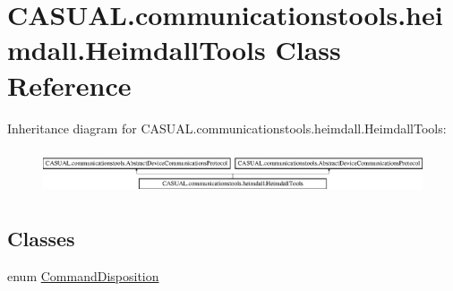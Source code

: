 \hypertarget{class_c_a_s_u_a_l_1_1communicationstools_1_1heimdall_1_1_heimdall_tools}{\section{C\-A\-S\-U\-A\-L.\-communicationstools.\-heimdall.\-Heimdall\-Tools Class Reference}
\label{class_c_a_s_u_a_l_1_1communicationstools_1_1heimdall_1_1_heimdall_tools}
}
Inheritance diagram for C\-A\-S\-U\-A\-L.\-communicationstools.\-heimdall.\-Heimdall\-Tools\-:\begin{figure}[H]
\begin{center}
\leavevmode
\includegraphics[height=1.339713cm]{class_c_a_s_u_a_l_1_1communicationstools_1_1heimdall_1_1_heimdall_tools}
\end{center}
\end{figure}
\subsection*{Classes}
\begin{DoxyCompactItemize}
\item 
enum \hyperlink{enum_c_a_s_u_a_l_1_1communicationstools_1_1heimdall_1_1_heimdall_tools_1_1_command_disposition}{Command\-Disposition}
\end{DoxyCompactItemize}
